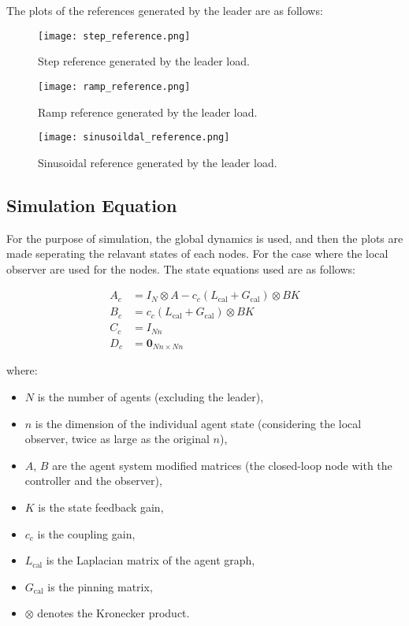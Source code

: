 The plots of the references generated by the leader are as follows:
\begin{figure}[H] %
    \centering
    \texttt{[image: step\_reference.png]} %
    \caption{Step reference generated by the leader load.}
\end{figure}

\begin{figure}[H] %
    \centering
    \texttt{[image: ramp\_reference.png]} %
    \caption{Ramp reference generated by the leader load.}
\end{figure}

\begin{figure}[H] %
    \centering
    \texttt{[image: sinusoildal\_reference.png]} %
    \caption{Sinusoidal reference generated by the leader load.}
\end{figure}


\subsection{Simulation Equation}
For the purpose of simulation, the global dynamics is used, and then the plots are made seperating the relavant states of each nodes. For the case where the local observer are used for the nodes. The state equations used are as follows:


\begin{align*}
A_c &= I_N \otimes A - c_c (L_{\text{cal}} + G_{\text{cal}}) \otimes BK \\
B_c &= c_c (L_{\text{cal}} + G_{\text{cal}}) \otimes BK \\
C_c &= I_{Nn} \\
D_c &= \mathbf{0}_{Nn \times Nn}
\end{align*}

where:
\begin{itemize}
  \item $N$ is the number of agents (excluding the leader),
  \item $n$ is the dimension of the individual agent state (considering the local observer, twice as large as the original $n$),
  \item $A$, $B$ are the agent system modified matrices (the closed-loop node with the controller and the observer),
  \item $K$ is the state feedback gain,
  \item $c_c$ is the coupling gain,
  \item $L_{\text{cal}}$ is the Laplacian matrix of the agent graph,
  \item $G_{\text{cal}}$ is the pinning matrix,
  \item $\otimes$ denotes the Kronecker product.
\end{itemize}

